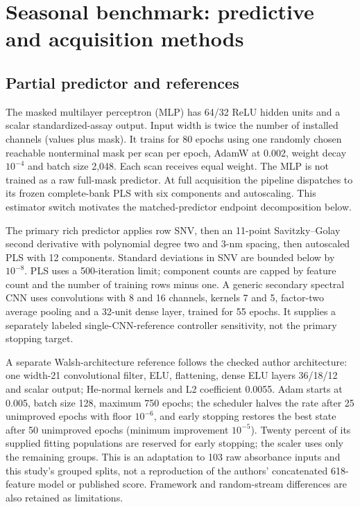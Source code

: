 \documentclass[10pt,a4paper]{article}
\begin{document}
\section{Seasonal benchmark: predictive and acquisition methods}
\subsection{Partial predictor and references}
The masked multilayer perceptron (MLP) has 64/32 ReLU hidden units and a scalar standardized-assay output. Input width is twice the number of installed channels (values plus mask). It trains for 80 epochs using one randomly chosen reachable nonterminal mask per scan per epoch, AdamW at 0.002, weight decay $10^{-4}$ and batch size 2,048. Each scan receives equal weight. The MLP is not trained as a raw full-mask predictor. At full acquisition the pipeline dispatches to its frozen complete-bank PLS with six components and autoscaling. This estimator switch motivates the matched-predictor endpoint decomposition below.

The primary rich predictor applies row SNV, then an 11-point Savitzky--Golay second derivative with polynomial degree two and 3-nm spacing, then autoscaled PLS with 12 components. Standard deviations in SNV are bounded below by $10^{-8}$. PLS uses a 500-iteration limit; component counts are capped by feature count and the number of training rows minus one. A generic secondary spectral CNN uses convolutions with 8 and 16 channels, kernels 7 and 5, factor-two average pooling and a 32-unit dense layer, trained for 55 epochs. It supplies a separately labeled single-CNN-reference controller sensitivity, not the primary stopping target.

A separate Walsh-architecture reference follows the checked author architecture:\citep{walsh2024} one width-21 convolutional filter, ELU, flattening, dense ELU layers 36/18/12 and scalar output; He-normal kernels and L2 coefficient 0.0055. Adam starts at 0.005, batch size 128, maximum 750 epochs; the scheduler halves the rate after 25 unimproved epochs with floor $10^{-6}$, and early stopping restores the best state after 50 unimproved epochs (minimum improvement $10^{-5}$). Twenty percent of its supplied fitting populations are reserved for early stopping; the scaler uses only the remaining groups. This is an adaptation to 103 raw absorbance inputs and this study's grouped splits, not a reproduction of the authors' concatenated 618-feature model or published score. Framework and random-stream differences are also retained as limitations.
\end{document}

